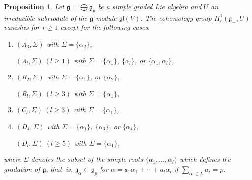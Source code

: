 \documentclass[10pt,a4paper]{amsart}
\newcommand{\g}{\mathfrak g}
\newcommand{\gl}{\mathfrak{gl}}
\newcommand{\V}{V}
\newtheorem{prop}[thm]{Proposition}
\numberwithin{equation}{section}
\begin{document}
\begin{prop}\label{thm3} Let $\g = \bigoplus \g_p $ be a simple graded Lie algebra and $U$ an irreducible submodule of the $\g$-module $\gl(\V)$. The cohomology group $H^1_r(\g_-, U)$ vanishes for $r \ge 1$ except for the following cases$:$
\begin{enumerate}\itemsep=0pt
\item[$1.$] $(A_3,\Sigma)$ with $\Sigma=\{\alpha_2\}$,

$(A_l, \Sigma) \ (l\ge 1 )$ with $\Sigma = \{\alpha_1\}$, $\{\alpha_l\}$, or $\{\alpha_1, \alpha_l\}$,

\item[$2.$] $(B_2, \Sigma)$ with $\Sigma = \{\alpha_1\}$, or $\{\alpha_2 \}$,

$(B_l, \Sigma) \ (l\ge 3 )$ with $\Sigma = \{\alpha_1\}$,

\item[$3.$] $(C_l, \Sigma) \ (l\ge 3 )$ with $\Sigma = \{\alpha_1\}$,


\item[$4.$] $(D_4, \Sigma) $ with $\Sigma = \{\alpha_1\}$, $\{\alpha_3 \}$, or $\{\alpha_4 \}$,

$(D_l, \Sigma) \ (l\ge 5 )$ with $\Sigma = \{\alpha_1\}$,
\end{enumerate}
	where $\Sigma$ denotes the subset of the simple roots $\{\alpha_1, \dots, \alpha_l\}$
	which defines the gradation of $\g$, that~is, $\g_{\alpha} \subset \g_p$ for
	$\alpha = a_1\alpha_1 + \cdots + a_l\alpha_l$
	if
	$ \sum	_{\alpha_i \in \Sigma} a_i	= p	$.
\end{prop}
\end{document}
